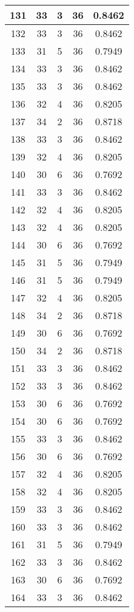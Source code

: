 \documentclass[letterpaper, 12pt]{article}
\begin{document}
\begin{longtable}{|c|c|c|c|c|}
\hline
131 & 33 & 3 & 36 & 0.8462 \\
\hline
132 & 33 & 3 & 36 & 0.8462 \\
\hline
133 & 31 & 5 & 36 & 0.7949 \\
\hline
134 & 33 & 3 & 36 & 0.8462 \\
\hline
135 & 33 & 3 & 36 & 0.8462 \\
\hline
136 & 32 & 4 & 36 & 0.8205 \\
\hline
137 & 34 & 2 & 36 & 0.8718 \\
\hline
138 & 33 & 3 & 36 & 0.8462 \\
\hline
139 & 32 & 4 & 36 & 0.8205 \\
\hline
140 & 30 & 6 & 36 & 0.7692 \\
\hline
141 & 33 & 3 & 36 & 0.8462 \\
\hline
142 & 32 & 4 & 36 & 0.8205 \\
\hline
143 & 32 & 4 & 36 & 0.8205 \\
\hline
144 & 30 & 6 & 36 & 0.7692 \\
\hline
145 & 31 & 5 & 36 & 0.7949 \\
\hline
146 & 31 & 5 & 36 & 0.7949 \\
\hline
147 & 32 & 4 & 36 & 0.8205 \\
\hline
148 & 34 & 2 & 36 & 0.8718 \\
\hline
149 & 30 & 6 & 36 & 0.7692 \\
\hline
150 & 34 & 2 & 36 & 0.8718 \\
\hline
151 & 33 & 3 & 36 & 0.8462 \\
\hline
152 & 33 & 3 & 36 & 0.8462 \\
\hline
153 & 30 & 6 & 36 & 0.7692 \\
\hline
154 & 30 & 6 & 36 & 0.7692 \\
\hline
155 & 33 & 3 & 36 & 0.8462 \\
\hline
156 & 30 & 6 & 36 & 0.7692 \\
\hline
157 & 32 & 4 & 36 & 0.8205 \\
\hline
158 & 32 & 4 & 36 & 0.8205 \\
\hline
159 & 33 & 3 & 36 & 0.8462 \\
\hline
160 & 33 & 3 & 36 & 0.8462 \\
\hline
161 & 31 & 5 & 36 & 0.7949 \\
\hline
162 & 33 & 3 & 36 & 0.8462 \\
\hline
163 & 30 & 6 & 36 & 0.7692 \\
\hline
164 & 33 & 3 & 36 & 0.8462 \\

\end{longtable}
\end{document}
